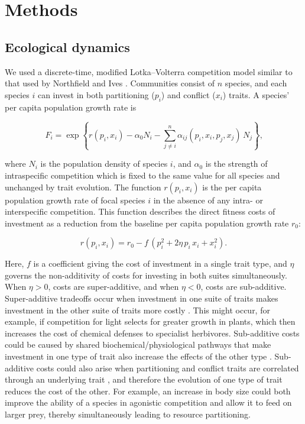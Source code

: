 
\section*{Methods}

\subsection*{Ecological dynamics}

We used a discrete-time, modified Lotka--Volterra competition model
similar to that used by Northfield and Ives
\citep{Northfield2013a}. Communities consist of $n$ species,
and each species $i$ can invest in both partitioning ($p_{i}$) and
conflict ($x_{i}$) traits. A species' per capita population growth
rate is

\begin{equation} \label{eq:pg-growth}
    F_{i} = \exp\left\{
        r(p_i, x_i)
        - \alpha_0 N_{i} 
        - \sum_{j \ne i}^{n}{
            \alpha_{ij}(p_i, x_i, p_j, x_j) \, N_j}
        \right\}
    \textrm{,}
\end{equation}

where $N_{i}$ is the population density of species $i$, and
$\alpha_{0}$ is the strength of intraspecific competition which is
fixed to the same value for all species and unchanged by trait
evolution. The function $r( p_{i},x_{i} )$ is the per
capita population growth rate of focal species $i$ in the absence of
any intra- or interspecific competition. This function describes the
direct fitness costs of investment as a reduction from the baseline per
capita population growth rate $r_{0}$:

\begin{equation} \label{eq:growth-rate}
    r(p_i, x_i) = r_0 - f \, \left( p_i^2 + 2 \eta \, p_i \, x_i + x_i^2 \right)
    \textrm{.}
\end{equation}

Here, $f$ is a coefficient giving the cost of investment in a single
trait type, and $\eta$ governs the non-additivity of costs for
investing in both suites simultaneously. When $\eta > 0$, costs are
super-additive, and when $\eta < 0$, costs are sub-additive.
Super-additive tradeoffs occur when investment in one suite of traits
makes investment in the other suite of traits more costly \citep{Garland2022}.
% 
This might occur, for example, if competition for light selects for greater
growth in plants, which then increases the cost of chemical defenses to
specialist herbivores.
% 
Sub-additive costs could be caused by shared
biochemical/physiological pathways that make investment in one type of
trait also increase the effects of the other type \citep{Garland1994,
Garland2022}. Sub-additive costs could also arise when
partitioning and conflict traits are correlated through an underlying
trait \citep{Strauss2004}, and therefore the evolution of one
type of trait reduces the cost of the other. For example, an increase in
body size could both improve the ability of a species in agonistic competition
and allow it to feed on larger prey, thereby simultaneously leading to 
resource partitioning.

